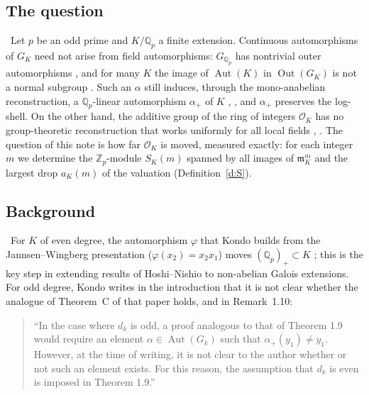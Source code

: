 \documentclass[11pt,a4paper]{article}
\newcommand{\Zp}{\mathbb{Z}_p}
\newcommand{\Qp}{\mathbb{Q}_p}
\newcommand{\cO}{\mathcal{O}}
\newcommand{\fm}{\mathfrak{m}}
\newcommand{\Aut}{\operatorname{Aut}}
\newcommand{\Out}{\operatorname{Out}}
\newcommand{\lab}[2]{{\upshape\fcolorbox{#1}{#1!8}{\scriptsize\sffamily\bfseries\textcolor{#1}{#2}}}}
\newcommand{\tagS}{\lab{blue}{S}}
\theoremstyle{plain}
\theoremstyle{definition}
\theoremstyle{remark}
\begin{document}
\subsection{The question}
\tagS\ Let $p$ be an odd prime and $K/\Qp$ a finite extension. Continuous automorphisms of $G_K$ need not arise from
field automorphisms: $G_{\Qp}$ has nontrivial outer automorphisms \cite[pp.~421--423]{NSW}, and for many $K$ the image
of $\Aut(K)$ in $\Out(G_K)$ is not a normal subgroup \cite{HN,Kondo}. Such an $\alpha$ still induces, through the
mono-anabelian reconstruction, a $\Qp$-linear automorphism $\alpha_+$ of $K$ \cite{Hoshi}, \cite[\S0]{Kondo}, and
$\alpha_+$ preserves the log-shell. On the other hand, the additive group of the ring of integers $\cO_K$ has no
group-theoretic reconstruction that works uniformly for all local fields \cite[Rem.~4.3.1(iii)]{Hoshi},
\cite[Rem.~2.11.2]{HoshiTop}. The question of this note is how far $\cO_K$ is moved, measured exactly: for each
integer $m$ we determine the $\Zp$-module $S_K(m)$ spanned by all images of $\fm_K^m$ and the largest drop $a_K(m)$
of the valuation (Definition~\ref{d:S}).

\subsection{Background}
\tagS\ For $K$ of even degree, the automorphism $\varphi$ that Kondo builds from the Jannsen--Wingberg presentation
($\varphi(x_2)=x_2x_1$) moves $(\Qp)_+\subset K$ \cite[Lemma~1.5]{Kondo}; this is the key step in extending results
of Hoshi--Nishio \cite{HN} to non-abelian Galois extensions. For odd degree, Kondo writes in the introduction that it
is not clear whether the analogue of Theorem~C of that paper holds, and in Remark~1.10:
\begin{quote}\small
``In the case where $d_k$ is odd, a proof analogous to that of Theorem 1.9 would require an element
$\alpha\in\Aut(G_k)$ such that $\alpha_+(y_1)\ne y_1$. However, at the time of writing, it is not clear to the author
whether or not such an element exists. For this reason, the assumption that $d_k$ is even is imposed in Theorem
1.9.'' \cite[Rem.~1.10]{Kondo}
\end{quote}
\end{document}
